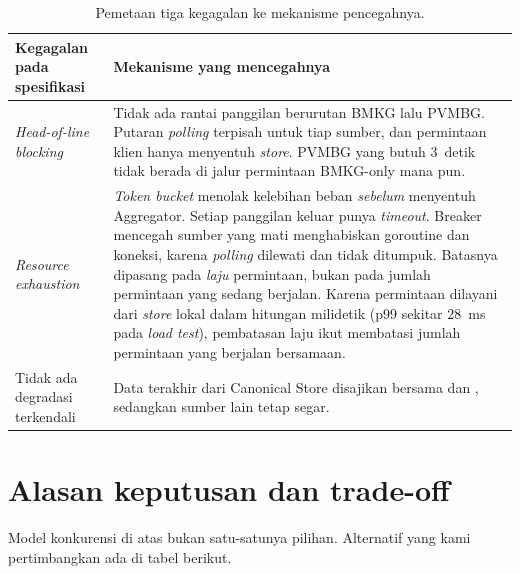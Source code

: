 \begin{table}[H]
\centering\small
\begin{tabularx}{\textwidth}{@{}L{3.4cm}Y@{}}
\toprule
\textbf{Kegagalan pada spesifikasi} & \textbf{Mekanisme yang mencegahnya}\\
\midrule
\emph{Head-of-line blocking} & Tidak ada rantai panggilan berurutan BMKG lalu PVMBG. Putaran \emph{polling} terpisah untuk tiap sumber, dan permintaan klien hanya menyentuh \emph{store}. PVMBG yang butuh 3~detik tidak berada di jalur permintaan BMKG-only mana pun.\\
\emph{Resource exhaustion} & \emph{Token bucket} menolak kelebihan beban \emph{sebelum} menyentuh Aggregator. Setiap panggilan keluar punya \emph{timeout}. Breaker mencegah sumber yang mati menghabiskan goroutine dan koneksi, karena \emph{polling} dilewati dan tidak ditumpuk. Batasnya dipasang pada \emph{laju} permintaan, bukan pada jumlah permintaan yang sedang berjalan. Karena permintaan dilayani dari \emph{store} lokal dalam hitungan milidetik (p99 sekitar 28~ms pada \emph{load test}), pembatasan laju ikut membatasi jumlah permintaan yang berjalan bersamaan.\\
Tidak ada degradasi terkendali & Data terakhir dari Canonical Store disajikan bersama  dan , sedangkan sumber lain tetap segar.\\
\bottomrule
\end{tabularx}
\caption{Pemetaan tiga kegagalan ke mekanisme pencegahnya.}
\end{table}

\section{Alasan keputusan dan trade-off}

Model konkurensi di atas bukan satu-satunya pilihan. Alternatif yang kami pertimbangkan ada di tabel berikut.

